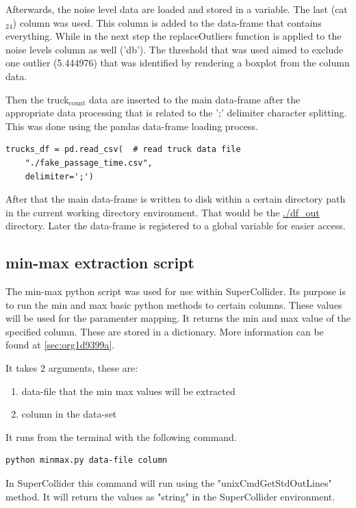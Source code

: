 \documentclass[11pt]{article}
\begin{document}
Afterwards, the noise level data are loaded and stored in a variable.  The last (cat\(_{\text{24}}\)) column was used.  This column is added to the data-frame that contains everything.  While in the next step the replaceOutliers function is applied to the noise levels column as well ('db').  The threshold that was used aimed to exclude one outlier (5.444976) that was identified by rendering a boxplot from the column data.

Then the truck\(_{\text{count}}\) data are inserted to the main data-frame after the appropriate data processing that is related to the ';' delimiter character splitting. This was done using the pandas data-frame loading process.

\begin{verbatim}
trucks_df = pd.read_csv(  # read truck data file
    "./fake_passage_time.csv",
    delimiter=';')
\end{verbatim}

After that the main data-frame is written to disk within a certain directory path in the current working directory environment.  That would be the \url{./df\_out} directory.
Later the data-frame is registered to a global variable for easier access.

\subsection{min-max extraction script}
\label{sec:orga1ee8c3}
The min-max python script was used for use within SuperCollider.  Its purpose is to run the min and max basic python methods to certain columns.  These values will be used for the paramenter mapping.  It returns the min and max value of the specified column.  These are stored in a dictionary.  More information can be found at  \ref{sec:org1d9399a}.

It takes 2 arguments, these are:
\begin{enumerate}
\item data-file that the min max values will be extracted
\item column in the data-set
\end{enumerate}

It runs from the terminal with the following command.
\begin{verbatim}
python minmax.py data-file column
\end{verbatim}

In SuperCollider this command will run using the "unixCmdGetStdOutLines" method.  It will return the values as "string" in the SuperCollider environment.
\end{document}
